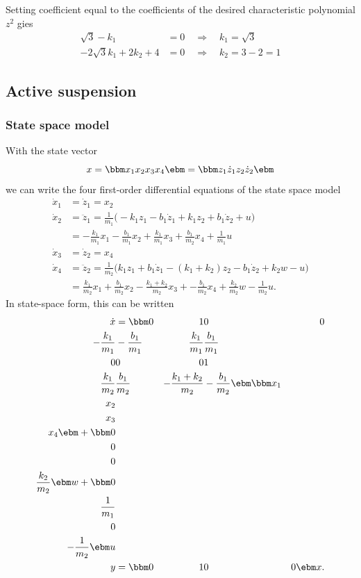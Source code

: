 \documentclass[a4paper]{scrartcl}
\begin{document}
Setting coefficient equal to the coefficients of the desired characteristic polynomial \(z^2\) gies
\begin{align*}
\sqrt{3}-k_1 &= 0 \quad \Rightarrow \quad k_1 = \sqrt{3}\\
-2\sqrt{3}k_1 + 2k_2 + 4 &= 0 \quad \Rightarrow \quad k_2 = 3-2 = 1
\end{align*}

\subsection*{Active suspension}
\label{sec-3-2}
\subsubsection*{State space model}
\label{sec-3-2-1}
With the state vector 
 \[ x = \bbm x_1\\x_2\\x_3\\x_4 \ebm = \bbm z_1\\ \dot{z}_1 \\ z_2\\ \dot{z}_2 \ebm \]
 we can write the four first-order differential equations of the state space model
 \begin{align*}
  \dot{x}_1 &= \dot{z}_1 = x_2\\
  \dot{x}_2 &= \ddot{z}_1 = \frac{1}{m_1}\Big(-k_1z_1 -b_1\dot{z}_1 + k_1z_2 + b_1\dot{z}_2 + u\Big)\\
            &= -\frac{k_1}{m_1}x_1 - \frac{b_1}{m_1}x_2 + \frac{k_1}{m_1}x_3 + \frac{b_1}{m_2}x_4 + \frac{1}{m_1} u\\
  \dot{x}_3 &= \dot{z}_2 = x_4\\
  \dot{x}_4 &= \ddot{z}_2 = \frac{1}{m_2} \Big(k_1z_1 + b_1\dot{z}_1 - (k_1+k_2)z_2 - b_1\dot{z}_2 + k_2w - u\Big)\\ 
            &= \frac{k_1}{m_2} x_1 + \frac{b_1}{m_2} x_2 - \frac{k_1+k_2}{m_2}x_3 + -\frac{b_1}{m_2}x_4 + \frac{k_2}{m_2}w - \frac{1}{m_2}u.
\end{align*}
In state-space form, this can be written
\begin{align*}
\dot{x} &= \bbm 0 & 1 & 0 & 0\\ 
-\frac{k_1}{m_1} & -\frac{b_1}{m_1} & \frac{k_1}{m_1} & \frac{b_1}{m_1}\\
0 & 0 & 0 & 1\\
\frac{k_1}{m_2} & \frac{b_1}{m_2} & -\frac{k_1+k_2}{m_2} & -\frac{b_1}{m_2}\ebm
\bbm x_1\\x_2\\x_3\\x_4 \ebm + \bbm 0\\0\\0\\\frac{k_2}{m_2} \ebm w + \bbm 0\\\frac{1}{m_1}\\0\\-\frac{1}{m_2} \ebm u \\
y &= \bbm 0 & 1 & 0 & 0 \ebm x.
\end{align*}
\end{document}
